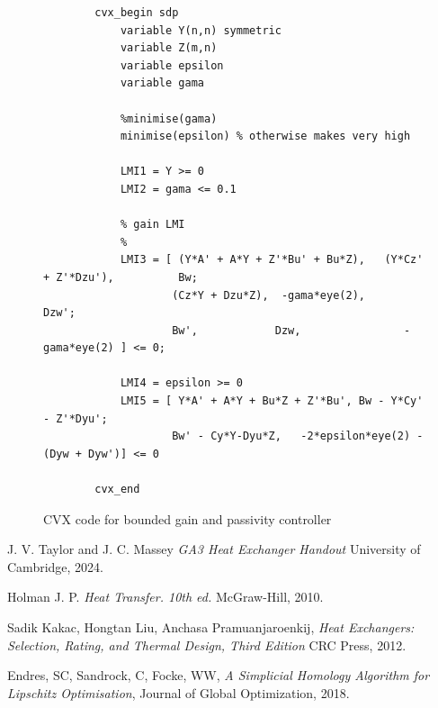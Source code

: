 \documentclass{article}
\begin{document}
\begin{figure}[H]
    \centering
    \begin{lstlisting}
        cvx_begin sdp
            variable Y(n,n) symmetric
            variable Z(m,n)
            variable epsilon
            variable gama
            
            %minimise(gama)
            minimise(epsilon) % otherwise makes very high

            LMI1 = Y >= 0
            LMI2 = gama <= 0.1
            
            % gain LMI
            %
            LMI3 = [ (Y*A' + A*Y + Z'*Bu' + Bu*Z),   (Y*Cz' + Z'*Dzu'),          Bw;
                    (Cz*Y + Dzu*Z),  -gama*eye(2),      Dzw';
                    Bw',            Dzw,                -gama*eye(2) ] <= 0;
            
            LMI4 = epsilon >= 0
            LMI5 = [ Y*A' + A*Y + Bu*Z + Z'*Bu', Bw - Y*Cy' - Z'*Dyu';
                    Bw' - Cy*Y-Dyu*Z,   -2*epsilon*eye(2) - (Dyw + Dyw')] <= 0
                
        cvx_end
    \end{lstlisting}
    \caption{CVX code for bounded gain and passivity controller}
    \label{fig:bounded_passive_lmi}
\end{figure}

\begin{thebibliography}{9}

    
      J. V. Taylor and J. C. Massey
      \emph{GA3 Heat Exchanger Handout}
      University of Cambridge,
      2024.
    
      Holman J. P.
      \emph{Heat Transfer. 10th ed.}
      McGraw-Hill,
      2010.
    
      Sadik Kakac, Hongtan Liu, Anchasa Pramuanjaroenkij,
      \emph{Heat Exchangers: Selection, Rating, and Thermal Design, Third Edition}
      CRC Press,
      2012.
    
      Endres, SC, Sandrock, C, Focke, WW,
      \emph{A Simplicial Homology Algorithm for Lipschitz Optimisation},
      Journal of Global Optimization,
      2018.
    
\end{thebibliography}
\end{document}
